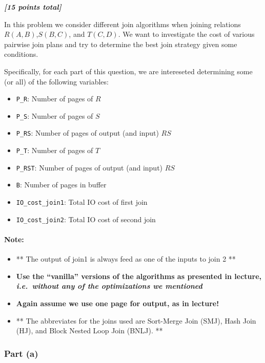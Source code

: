 \documentclass[11pt]{article}
\providecommand{\tightlist}{%
      \setlength{\itemsep}{0pt}\setlength{\parskip}{0pt}}
\begin{document}
\textbf{\emph{{[}15 points total{]}}}

    In this problem we consider different join algorithms when joining
relations \(R(A,B)\),\(S(B,C)\), and \(T(C,D)\). We want to investigate
the cost of various pairwise join plans and try to determine the best
join strategy given some conditions.

Specifically, for each part of this question, we are intereseted
determining some (or all) of the following variables:

\begin{itemize}
\tightlist
\item
  \texttt{P\_R}: Number of pages of \(R\)
\item
  \texttt{P\_S}: Number of pages of \(S\)
\item
  \texttt{P\_RS}: Number of pages of output (and input) \(RS\)
\item
  \texttt{P\_T}: Number of pages of \(T\)
\item
  \texttt{P\_RST}: Number of pages of output (and input) \(RS\)
\item
  \texttt{B}: Number of pages in buffer
\item
  \texttt{IO\_cost\_join1}: Total IO cost of first join
\item
  \texttt{IO\_cost\_join2}: Total IO cost of second join
\end{itemize}

\hypertarget{note}{%
\paragraph{Note:}\label{note}}

\begin{itemize}
\tightlist
\item
  ** The output of join1 is always feed as one of the inputs to join 2
  **
\item
  \textbf{Use the ``vanilla'' versions of the algorithms as presented in
  lecture, \emph{i.e.~without any of the optimizations we mentioned}}
\item
  \textbf{Again assume we use one page for output, as in lecture!}
\item
  ** The abbreviates for the joins used are Sort-Merge Join (SMJ), Hash
  Join (HJ), and Block Nested Loop Join (BNLJ). **
\end{itemize}

    \hypertarget{part-a}{%
\subsubsection{Part (a)}\label{part-a}}
\end{document}

